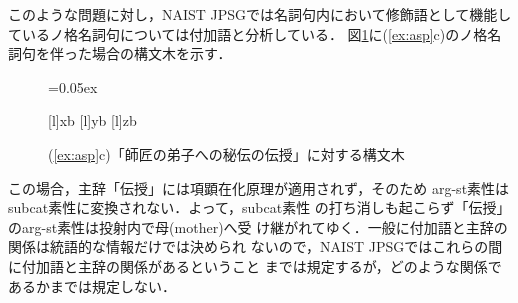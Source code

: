 このような問題に対し，NAIST JPSGでは名詞句内において修飾語として機能し
ているノ格名詞句については付加語と分析している．
図\ref{fig:scaa}に(\ref{ex:asp}c)のノ格名詞句を伴った場合の構文木を示す．
\begin{figure}
\begin{center}
 \unitlength=0.05ex
 \hspace*{25zw}
\end{center}
[l]{xb}
[l]{yb}
[l]{zb}
\caption{{\protect (\ref{ex:asp}c)}「師匠の弟子への秘伝の伝授」に対する構文木}\label{fig:scaa}
\vspace*{-0.2mm}
\end{figure}
この場合，主辞「伝授」には項顕在化原理が適用されず，そのため{\sc
arg-st}素性は{\sc subcat}素性に変換されない．よって，{\sc subcat}素性
の打ち消しも起こらず「伝授」の{\sc arg-st}素性は投射内で母(mother)へ受
け継がれてゆく．一般に付加語と主辞の関係は統語的な情報だけでは決められ
ないので，NAIST JPSGではこれらの間に付加語と主辞の関係があるということ
までは規定するが，どのような関係であるかまでは規定しない．

